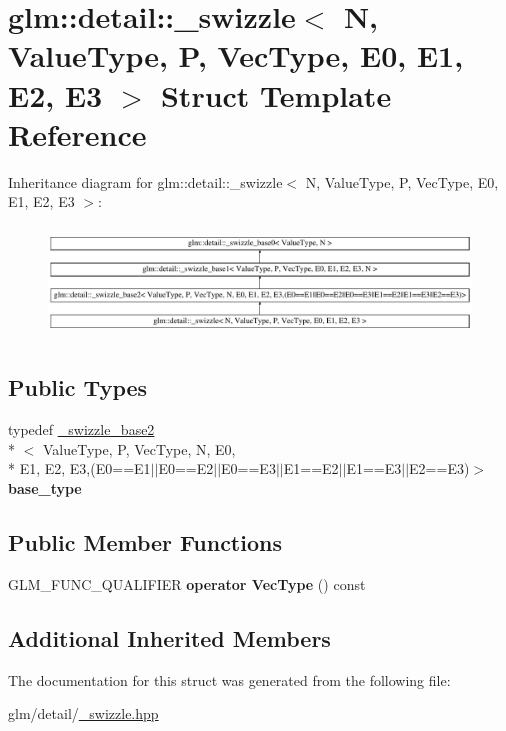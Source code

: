 \hypertarget{structglm_1_1detail_1_1__swizzle}{\section{glm\-:\-:detail\-:\-:\-\_\-swizzle$<$ N, Value\-Type, P, Vec\-Type, E0, E1, E2, E3 $>$ Struct Template Reference}
\label{structglm_1_1detail_1_1__swizzle}
}
Inheritance diagram for glm\-:\-:detail\-:\-:\-\_\-swizzle$<$ N, Value\-Type, P, Vec\-Type, E0, E1, E2, E3 $>$\-:\begin{figure}[H]
\begin{center}
\leavevmode
\includegraphics[height=3.002681cm]{structglm_1_1detail_1_1__swizzle}
\end{center}
\end{figure}
\subsection*{Public Types}
\begin{DoxyCompactItemize}
\item 
\hypertarget{structglm_1_1detail_1_1__swizzle_acf7dfa9d7456eb833c247473c5a045f4}{typedef \hyperlink{structglm_1_1detail_1_1__swizzle__base2}{\-\_\-swizzle\-\_\-base2}\\*
$<$ Value\-Type, P, Vec\-Type, N, E0, \\*
E1, E2, E3,(E0==E1$\vert$$\vert$E0==E2$\vert$$\vert$E0==E3$\vert$$\vert$E1==E2$\vert$$\vert$E1==E3$\vert$$\vert$E2==E3)$>$ {\bfseries base\-\_\-type}}\label{structglm_1_1detail_1_1__swizzle_acf7dfa9d7456eb833c247473c5a045f4}

\end{DoxyCompactItemize}
\subsection*{Public Member Functions}
\begin{DoxyCompactItemize}
\item 
\hypertarget{structglm_1_1detail_1_1__swizzle_a333cdd33d2fb442775cca23c77e63fca}{G\-L\-M\-\_\-\-F\-U\-N\-C\-\_\-\-Q\-U\-A\-L\-I\-F\-I\-E\-R {\bfseries operator Vec\-Type} () const }\label{structglm_1_1detail_1_1__swizzle_a333cdd33d2fb442775cca23c77e63fca}

\end{DoxyCompactItemize}
\subsection*{Additional Inherited Members}


The documentation for this struct was generated from the following file\-:\begin{DoxyCompactItemize}
\item 
glm/detail/\hyperlink{__swizzle_8hpp}{\-\_\-swizzle.\-hpp}\end{DoxyCompactItemize}
